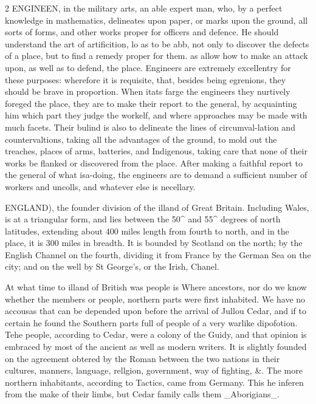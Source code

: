 \documentclass[10pt]{article}
\begin{document}
\begin{multicols}{2}
ENGINEEN, in the military arts, an able expert man, who, by a perfect knowledge in mathematics, delineates upon paper, or marks upon the ground, all sorts of forms, and other works proper for officers and defence. He should understand the art of artificition, lo as to be abb, not only to discover the defects of a place, but to find a remedy proper for them. as allow how to make an attack upon, as well as to defend, the place. Engineers are extremely excellentry for these purposes: wherefore it is requisite, that, besides being egrenions, they should be brave in proportion. When itats farge the engineers they nurtively foreged the place, they are to make their report to the general, by acquainting him which part they judge the workelf, and where approaches may be made with much facets. Their bulind is also to delineate the lines of circumval-lation and countervaltions, taking all the advantages of the ground, to mold out the treaches, places of arms, batteries, and Indigenous, taking care that none of their works be flanked or discovered from the place. After making a faithful report to the general of what isa-doing, the engineers are to demand a sufficient number of workers and uncolls, and whatever else is necellary.

ENGLAND), the founder division of the illand of Great Britain. Including Wales, is at a triangular form, and lies between the 50\textasciicircum{} and 55\textasciicircum{} degrees of north latitudes, extending about 400 miles length from fourth to north, and in the place, it is 300 miles in breadth. It is bounded by Scotland on the north; by the English Channel on the fourth, dividing it from France by the German Sea on the city; and on the well by St George's, or the Irish, Chanel.

At what time to illand of British was people is Where ancestors, nor do we know whether the members or people, northern parts were first inhabited. We have no accousas that can be depended upon before the arrival of Jullou Cedar, and if to certain he found the Southern parts full of people of a very warlike dipofotion. Tehe people, according to Cedar, were a colony of the Guidy, and that opinion is embraced by most of the ancient as well as modern writers. It is slightly founded on the agreement obtered by the Roman between the two nations in their cultures, manners, language, rellgion, government, way of fighting, \&. The more northern inhabitants, according to Tactics, came from Germany. This he inferen from the make of their limbs, but Cedar family calls them \_Aborigians\_.


\end{multicols}
\end{document}
